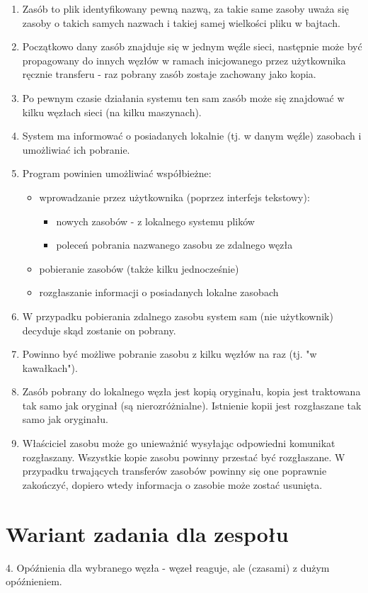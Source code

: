 \documentclass[11pt]{book}
\newcommand{\+}{\discretionary{\mbox{\scriptsize$\hookleftarrow$}}{}{}}
\begin{document}
\begin{enumerate}
\item
Zasób to plik identyfikowany pewną nazwą, za takie same zasoby uważa się zasoby o takich samych nazwach i takiej samej wielkości pliku w bajtach.
\item
Początkowo dany zasób znajduje się w jednym węźle sieci, następnie może być propagowany do innych węzłów w ramach inicjowanego przez użytkownika ręcznie transferu - raz pobrany zasób zostaje zachowany jako kopia.
\item
Po pewnym czasie działania systemu ten sam zasób może się znajdować w kilku węzłach sieci (na kilku maszynach).
\item
System ma informować o posiadanych lokalnie (tj. w danym węźle) zasobach i umożliwiać ich pobranie.
\item
Program powinien umożliwiać współbieżne:
\begin{itemize}
\item
wprowadzanie przez użytkownika (poprzez interfejs tekstowy):
\begin{itemize}
\item
nowych zasobów - z lokalnego systemu plików
\item
poleceń pobrania nazwanego zasobu ze zdalnego węzła
\end{itemize}
\item
pobieranie zasobów (także kilku jednocześnie)
\item
rozgłaszanie informacji o posiadanych lokalne zasobach
\end{itemize}
\item
W przypadku pobierania zdalnego zasobu system sam (nie użytkownik) decyduje skąd zostanie on pobrany.
\item
Powinno być możliwe pobranie zasobu z kilku węzłów na raz (tj. "w kawałkach").
\item
Zasób pobrany do lokalnego węzła jest kopią oryginału, kopia jest traktowana tak samo jak oryginał (są nierozróżnialne). Istnienie kopii jest rozgłaszane tak samo jak oryginału.
\item
Właściciel zasobu może go unieważnić wysyłając odpowiedni komunikat rozgłaszany. Wszystkie kopie zasobu powinny przestać być rozgłaszane. W przypadku trwających transferów zasobów powinny się one poprawnie zakończyć, dopiero wtedy informacja o zasobie może zostać usunięta.
\end{enumerate}
\section{Wariant zadania dla zespołu}
4. Opóźnienia dla wybranego węzła - węzeł reaguje, ale (czasami) z dużym opóźnieniem.
\end{document}
